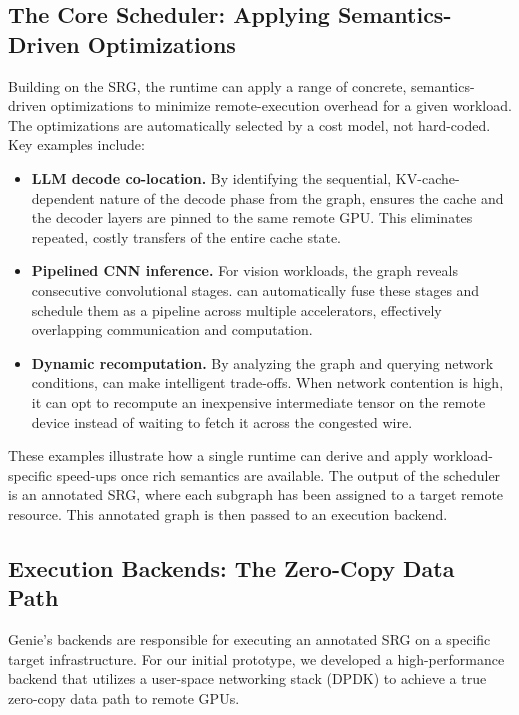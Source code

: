 \subsection{The Core Scheduler: Applying Semantics-Driven Optimizations}
\label{ssec:optimization}
Building on the SRG, the \sys{} runtime can apply a range of concrete, semantics-driven optimizations to minimize remote-execution overhead for a given workload. 
The optimizations are automatically selected by a cost model, not hard-coded. Key examples include:

\begin{itemize}[left=0pt]
    \item \textbf{LLM decode co-location.} By identifying the sequential, KV-cache-dependent nature of the decode phase from the graph, \sys{} ensures the cache and the decoder layers are pinned to the same remote GPU. This eliminates repeated, costly transfers of the entire cache state.
    \item \textbf{Pipelined CNN inference.} For vision workloads, the graph reveals consecutive convolutional stages. \sys{} can automatically fuse these stages and schedule them as a pipeline across multiple accelerators, effectively overlapping communication and computation.
    \item \textbf{Dynamic recomputation.} By analyzing the graph and querying network conditions, \sys{} can make intelligent trade-offs. When network contention is high, it can opt to recompute an inexpensive intermediate tensor on the remote device instead of waiting to fetch it across the congested wire.
\end{itemize}

These examples illustrate how a single runtime can derive and apply workload-specific speed-ups once rich semantics are available.
The output of the scheduler is an annotated SRG, where each subgraph has been assigned to a target remote resource. This annotated graph is then passed to an execution backend.

\subsection{Execution Backends: The Zero-Copy Data Path}
\label{ssec:zerocopy}
Genie's backends are responsible for executing an annotated SRG on a specific target infrastructure. For our initial prototype, we developed a high-performance backend that utilizes a user-space networking stack (DPDK) to achieve a true zero-copy data path to remote GPUs.

